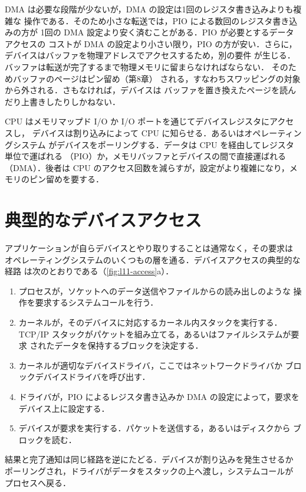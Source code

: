 \documentclass[../main.tex]{subfiles}
\begin{document}
DMA は必要な段階が少ないが，DMA の設定は1回のレジスタ書き込みよりも複雑な
操作である．そのため小さな転送では，PIO による数回のレジスタ書き込みの方が
1回の DMA 設定より安く済むことがある．PIO が必要とするデータアクセスの
コストが DMA の設定より小さい限り，PIO の方が安い．さらに，デバイスはバッファを物理アドレスでアクセスするため，別の要件
が生じる．バッファは転送が完了するまで物理メモリに留まらなければならない．
そのためバッファのページはピン留め（第8章）
される，すなわちスワッピングの対象から外される．さもなければ，デバイスは
バッファを置き換えたページを読んだり上書きしたりしかねない．

\begin{keypoint}
  CPU はメモリマップド I/O か I/O ポートを通じてデバイスレジスタにアクセスし，
  デバイスは割り込みによって CPU に知らせる．あるいはオペレーティングシステム
  がデバイスをポーリングする．データは CPU を経由してレジスタ単位で運ばれる
  （PIO）か，メモリバッファとデバイスの間で直接運ばれる（DMA）．後者は CPU
  のアクセス回数を減らすが，設定がより複雑になり，メモリのピン留めを要する．
\end{keypoint}

\section{典型的なデバイスアクセス}
\label{sec:l11-access}

アプリケーションが自らデバイスとやり取りすることは通常なく，その要求は
オペレーティングシステムのいくつもの層を通る．デバイスアクセスの典型的な経路
は次のとおりである（\cref{fig:l11-access}a）．
\begin{enumerate}
  \item プロセスが，ソケットへのデータ送信やファイルからの読み出しのような
    操作を要求するシステムコールを行う．
  \item カーネルが，そのデバイスに対応するカーネル内スタックを実行する．
    TCP/IP スタックがパケットを組み立てる，あるいはファイルシステムが要求
    されたデータを保持するブロックを決定する．
  \item カーネルが適切なデバイスドライバ，ここではネットワークドライバか
    ブロックデバイスドライバを呼び出す．
  \item ドライバが，PIO によるレジスタ書き込みか DMA の設定によって，要求を
    デバイス上に設定する．
  \item デバイスが要求を実行する．パケットを送信する，あるいはディスクから
    ブロックを読む．
\end{enumerate}
結果と完了通知は同じ経路を逆にたどる．デバイスが割り込みを発生させるか
ポーリングされ，ドライバがデータをスタックの上へ渡し，システムコールが
プロセスへ戻る．
\end{document}

